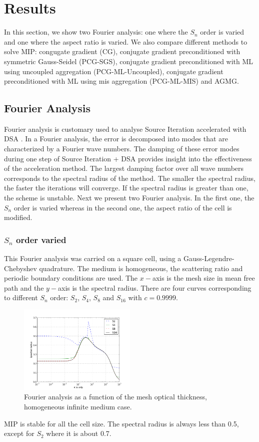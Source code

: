 \section{Results} \label{sec_res}
In this section, we show two Fourier analysis: one where the $S_n$ order is
varied and one where the aspect ratio is varied. We also compare different
methods to solve MIP: congugate gradient (CG), conjugate gradient
preconditioned with symmetric Gauss-Seidel (PCG-SGS), conjugate gradient
preconditioned with ML using uncoupled aggregation (PCG-ML-Uncoupled),
conjugate gradient preconditioned with ML using mis aggregation (PCG-ML-MIS)
and AGMG.
\subsection{Fourier Analysis}
Fourier analysis is customary used to analyse Source Iteration accelerated
with DSA \cite{larsen_dsa,consistent_p1}. In a Fourier analysis, the error is
decomposed into modes that are characterized by a Fourier wave numbers. The
damping of these error modes during one step of Source Iteration + DSA
provides insight into the effectiveness of the acceleration method. The
largest damping factor over all wave numbers corresponds to the spectral
radius of the method. The smaller the spectral radius, the faster the
iterations will converge. If the spectral radius is greater than one, the
scheme is unstable. Next we present two Fourier analysis. In the first one,
the $S_n$ order is varied whereas in the second one, the aspect ratio of the 
cell is modified.
\subsubsection{$S_n$ order varied}
This Fourier analysis was carried on a square cell, using a
Gauss-Legendre-Chebyshev quadrature. The medium is homogeneous, the scattering
ratio  and periodic boundary conditions are used. The $x-$axis is the mesh
size in mean free path and the $y-$axis is the spectral radius. There are four
curves corresponding to different $S_n$ order: $S_2$, $S_4$, $S_8$ and
$S_{16}$ with $c=0.9999$.
\begin{figure}[H]
\centering
\includegraphics[width=0.5\textwidth]{sn_order_9999}
\caption{Fourier analysis as a function of the mesh optical thickness,
homogeneous infinite medium case.}
\end{figure}
MIP is stable for all the cell size. The spectral radius is always less than
0.5, except for $S_2$ where it is about 0.7.
